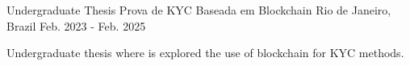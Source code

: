 

\begin{cventries}

  \cventry
    {Undergraduate Thesis} %
    {Prova de KYC Baseada em Blockchain} %
    {Rio de Janeiro, Brazil} %
    {Feb. 2023 - Feb. 2025} %
    {
      \begin{cvitems} %
        \item {Undergraduate thesis where is explored the use of blockchain for KYC methods.}
      \end{cvitems}
    }

\end{cventries}
